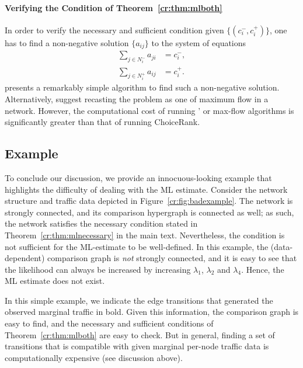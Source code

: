 \paragraph{Verifying the Condition of Theorem~\ref{cr:thm:mlboth}}
In order to verify the necessary and sufficient condition given $\{ (c^-_i, c^+_i) \}$, one has to find a non-negative solution $\{ a_{ij} \}$ to the system of equations
\begin{align*}
\sum_{j \in N^-_i} a_{ji} &= c^-_i, \\
\sum_{j \in N^+_i} a_{ij} &= c^+_i.
\end{align*}
\citet{dines1926positive} presents a remarkably simple algorithm to find such a non-negative solution.
Alternatively, \citet{kumar2015inverting} suggest recasting the problem as one of maximum flow in a network.
However, the computational cost of running \citeauthor{dines1926positive}' or max-flow algorithms is significantly greater than that of running ChoiceRank.

\subsection{Example}

To conclude our discussion, we provide an innocuous-looking example that highlights the difficulty of dealing with the ML estimate.
Consider the network structure and traffic data depicted in Figure~\ref{cr:fig:badexample}.
The network is strongly connected, and its comparison hypergraph is connected as well; as such, the network satisfies the necessary condition stated in Theorem~\ref{cr:thm:mlnecessary} in the main text.
Nevertheless, the condition is not sufficient for the ML-estimate to be well-defined.
In this example, the (data-dependent) comparison graph is \emph{not} strongly connected, and it is easy to see that the likelihood can always be increased by increasing $\lambda_1$, $\lambda_2$ and $\lambda_4$.
Hence, the ML estimate does not exist.

In this simple example, we indicate the edge transitions that generated the observed marginal traffic in bold.
Given this information, the comparison graph is easy to find, and the necessary and sufficient conditions of Theorem~\ref{cr:thm:mlboth} are easy to check.
But in general, finding a set of transitions that is compatible with given marginal per-node traffic data is computationally expensive (see discussion above).

